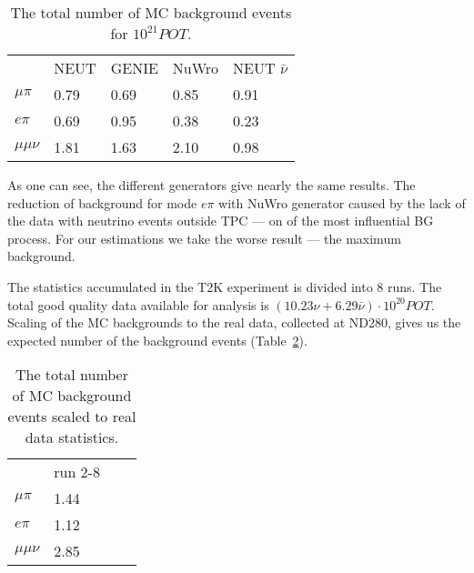 \documentclass[../main.tex]{subfiles}
\begin{document}
\begin{table}[!ht]
\begin{center}
\begin{tabular}{lllll}
                              & NEUT                    & GENIE                   & NuWro               & NEUT $\bar{\nu}$  \\
  $\mu\pi$ \hspace{0.5cm}     & 0.79   \hspace{1cm}     & 0.69  \hspace{1cm}      & 0.85  \hspace{1cm}  & 0.91              \\
  $e\pi$                      & 0.69                    & 0.95                    & 0.38                & 0.23              \\
  $\mu\mu\nu$                 & 1.81                    & 1.63                    & 2.10                & 0.98              \\
\end{tabular}
\caption{The total number of MC background events for $10^{21} POT$.}
\label{tbl:HNL:bg}
\end{center}
\end{table}

As one can see, the different generators give nearly the same results. The reduction of background for mode $e\pi$ with NuWro generator caused by the lack of the data with neutrino events outside TPC --- on of the most influential BG process. For our estimations we take the worse result --- the maximum background.

The statistics accumulated in the T2K experiment is divided into 8 runs. The total good quality data available for analysis is $\left(10.23\nu+6.29\bar{\nu}\right)\cdot 10^{20}POT$. Scaling of the MC backgrounds to the real data, collected at ND280, gives us the expected number of the background events (Table~\ref{tbl:HNL:bgScale}).

\begin{table}[!ht]
\begin{center}
\begin{tabular}{llll}
                            & run 2-8               \\
  $\mu\pi$ \hspace{0.5cm}   & 1.44  \hspace{2cm}    \\
  $e\pi$                    & 1.12                  \\
  $\mu\mu\nu$               & 2.85                  \\
\end{tabular}
\caption{The total number of MC background events scaled to real data statistics.}
\label{tbl:HNL:bgScale}
\end{center}
\end{table}
\end{document}
